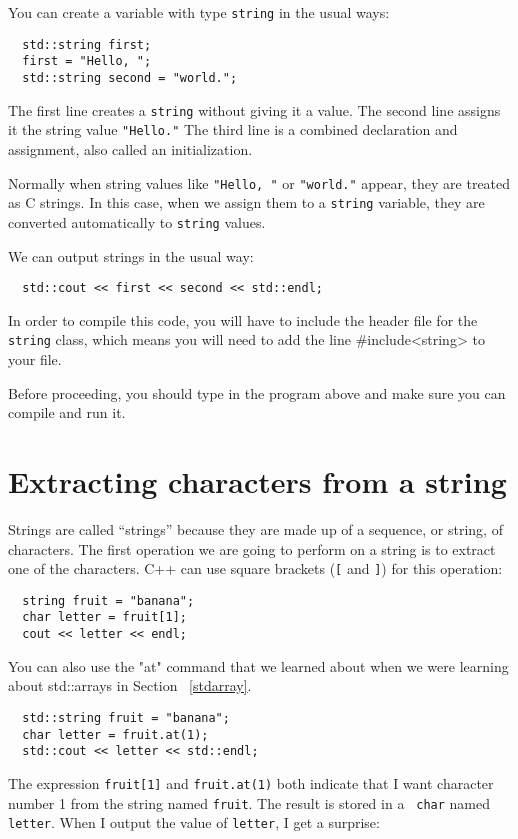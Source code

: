 You can create a variable with type {\tt string} in the usual
ways:

\begin{verbatim}
  std::string first;
  first = "Hello, ";
  std::string second = "world.";
\end{verbatim}
%
The first line creates a {\tt string} without giving it a value.
The second line assigns it the string value {\tt "Hello."}
The third line is a combined declaration and assignment, also
called an initialization.

Normally when string values like {\tt "Hello, "} or {\tt "world."}
appear, they are treated as C strings.  In this case, when we assign
them to a {\tt string} variable, they are converted automatically
to {\tt string} values.

We can output strings in the usual way:

\begin{verbatim}
  std::cout << first << second << std::endl;
\end{verbatim}
%

In order to compile this code, you will have to include the
header file for the {\tt string} class, which means you will need to
add the line \#include<string> to your file.  

Before proceeding, you should type in the program above and make
sure you can compile and run it.

\section{Extracting characters from a string}

Strings are called ``strings'' because they are made up of a sequence,
or string, of characters.  The first operation we are going to
perform on a string is to extract one of the characters.  C++
can use square brackets ({\tt [} and {\tt ]}) for this operation:

\begin{verbatim}
  string fruit = "banana";
  char letter = fruit[1];
  cout << letter << endl;
\end{verbatim}
%
You can also use the "at" command that we learned about when we were 
learning about std::arrays in Section ~\ref{stdarray}.
\begin{verbatim}
  std::string fruit = "banana";
  char letter = fruit.at(1);
  std::cout << letter << std::endl;
\end{verbatim}
The expression {\tt fruit[1]} and {\tt fruit.at(1)} both indicate that I want character number 1
from the string named {\tt fruit}.  The result is stored in a {\tt
char} named {\tt letter}.  When I output the value of {\tt letter}, I
get a surprise:

